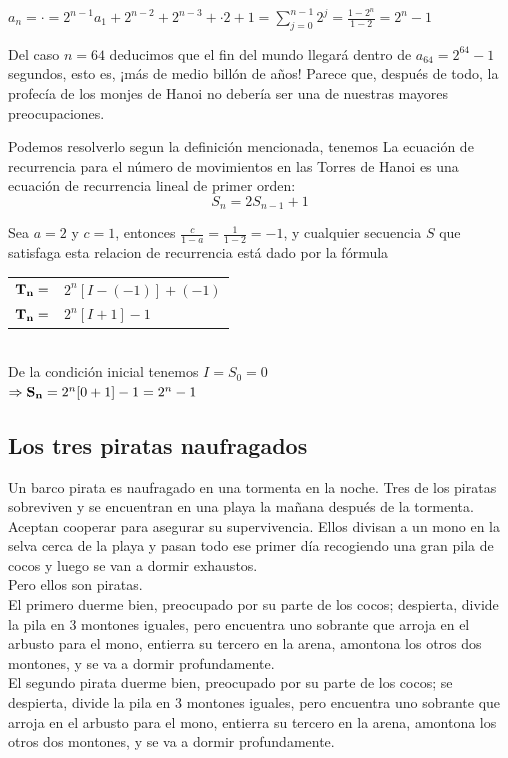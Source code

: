 \documentclass{article}
\begin{document}
$a_n = \cdot = 2^{n-1}a_1 + 2^{n-2} + 2^{n-3} + \cdot 2 + 1 = \sum_{j=0}^{n-1}2^j = \frac{1-2^n}{1-2} = 2^n - 1$

Del caso $n=64$ deducimos que el fin del mundo llegará dentro de $a_{64}= 2^{64} -1$ segundos, esto es, ¡más de medio billón de años! Parece que, después de todo, la profecía de los monjes de Hanoi no debería ser una de nuestras mayores preocupaciones.

Podemos resolverlo segun la definición mencionada, tenemos
La ecuación de recurrencia para el número de movimientos en las Torres de Hanoi es una ecuación de recurrencia lineal de primer orden:
$$S_n = 2 S_{n-1} + 1$$

Sea $a=2$ y $c=1$, entonces $\frac{c}{1-a} = \frac{1}{1-2} = -1$, y cualquier secuencia $S$ que satisfaga esta relacion de recurrencia está dado por la fórmula\\

\begin{tabular}{cl}
   ${\bf T_{n}} =$  & $2^{n}[I - (-1)] + (-1)$ \\
    ${\bf T_{n}} =$ & $2^{n}[I + 1] - 1$
\end{tabular}\\
De la condición inicial tenemos $I=S_0=0$\\
 $\Rightarrow {\bf S_n} = 2^{n}[0+1] - 1 = 2^n -1$ 


\subsection{Los tres piratas naufragados}

Un barco pirata es naufragado en una tormenta en la noche. Tres de los piratas sobreviven y se encuentran en una playa la mañana después de la tormenta. Aceptan cooperar para asegurar su supervivencia. Ellos divisan a un mono en la selva cerca de la playa y pasan todo ese primer día recogiendo una gran pila de cocos y luego se van a dormir exhaustos.\\
Pero ellos son piratas.\\
El primero duerme bien, preocupado por su parte de los cocos; despierta, divide la pila en 3 montones iguales, pero encuentra uno sobrante que arroja en el arbusto para el mono, entierra su tercero en la arena, amontona los otros dos montones, y se va a dormir profundamente.\\
El segundo pirata duerme bien, preocupado por su parte de los cocos; se despierta, divide la pila en 3 montones iguales, pero encuentra uno sobrante que arroja en el arbusto para el mono, entierra su tercero en la arena, amontona los otros dos montones, y se va a dormir profundamente.\\
\end{document}
